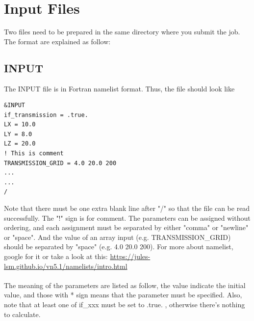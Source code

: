 \documentclass[10pt]{article}
\begin{document}
\section{Input Files}
Two files need to be prepared in the same directory where you submit the job. The format are explained as follow:
\subsection{INPUT}
The INPUT file is in Fortran namelist format. Thus, the file should look like
\begin{lstlisting}
&INPUT
if_transmission = .true.
LX = 10.0
LY = 8.0
LZ = 20.0
! This is comment
TRANSMISSION_GRID = 4.0 20.0 200
...
...
/

\end{lstlisting}
Note that there must be one extra blank line after "/" so that the file can be read successfully. The "!" sign is for comment. The parameters can be assigned without ordering, and each assignment must be separated by either "comma" or "newline" or "space". And the value of an array input (e.g. TRANSMISSION{\_}GRID) should be separated by "space" (e.g. 4.0 20.0 200). For more about namelist, google for it or take a look at this: \url{https://jules-lsm.github.io/vn5.1/namelists/intro.html}\\\\
The meaning of the parameters are listed as follow, the value indicate the initial value, and those with * sign means that the parameter must be specified. Also, note that at least one of if{\_}xxx must be set to .true. , otherwise there's nothing to calculate.
\end{document}
